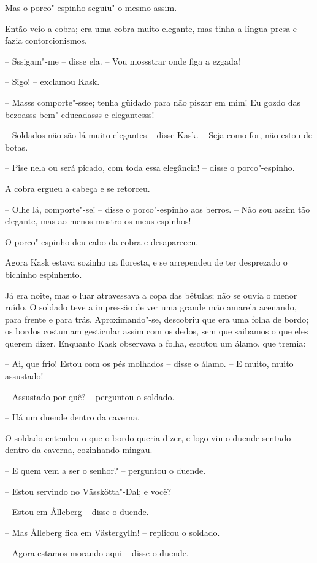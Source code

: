 Mas o porco"-espinho seguiu"-o mesmo assim.

Então veio a cobra; era uma cobra muito elegante, mas tinha a língua
presa e fazia contorcionismos.

-- Sssigam"-me -- disse ela. -- Vou mossstrar onde figa a ezgada!

-- Sigo! -- exclamou Kask.

-- Masss comporte"-ssse; tenha güidado para não piszar em mim! Eu gozdo
das bezoasss bem"-educadasss e elegantesss!

-- Soldados não são lá muito elegantes -- disse Kask.  -- Seja como for,
não estou de botas.

-- Pise nela ou será picado, com toda essa elegância! -- disse o
porco"-espinho.

A cobra ergueu a cabeça e se retorceu. 

-- Olhe lá, comporte"-se! -- disse o porco"-espinho aos berros. -- Não
sou assim tão elegante, mas ao menos mostro os meus espinhos!

O porco"-espinho deu cabo da cobra e desapareceu.

Agora Kask estava sozinho na floresta, e se arrependeu de ter desprezado
o bichinho espinhento.

Já era noite, mas o luar atravessava a copa das bétulas; não se ouvia o
menor ruído. O soldado teve a impressão de ver uma grande mão amarela acenando, para
frente e para trás. Aproximando"-se, descobriu que era uma folha de
bordo; os bordos costumam gesticular assim com os dedos, sem que
saibamos o que eles querem dizer. Enquanto Kask observava a folha,
escutou um álamo, que tremia:

-- Ai, que frio! Estou com os pés molhados -- disse o álamo. -- E muito,
muito assustado!

-- Assustado por quê? -- perguntou o soldado.

-- Há um duende dentro da caverna.

O soldado entendeu o que o bordo queria dizer, e logo viu o duende
sentado dentro da caverna, cozinhando mingau.

-- E quem vem a ser o senhor? -- perguntou o duende.

-- Estou servindo no Vässkötta"-Dal; e você?

-- Estou em \r Alleberg -- disse o duende.

-- Mas \r Alleberg fica em Västergylln! -- replicou o soldado.

-- Agora estamos morando aqui -- disse o duende.

